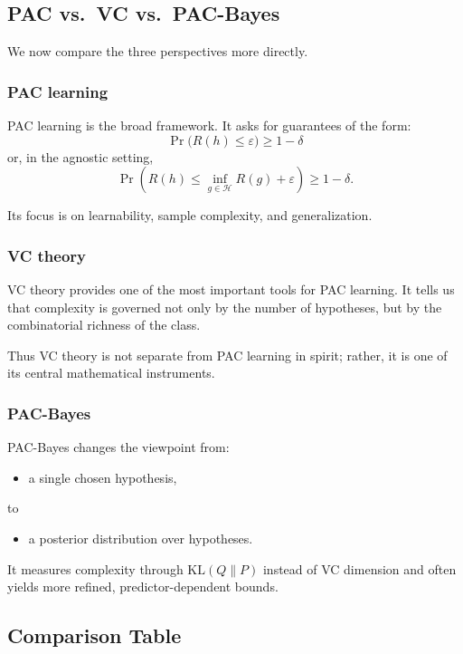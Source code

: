 \subsection{PAC vs.\ VC vs.\ PAC-Bayes}

We now compare the three perspectives more directly.

\subsubsection{PAC learning}

PAC learning is the broad framework. It asks for guarantees of the form:
\[
\Pr\big(R(h)\le \varepsilon\big)\ge 1-\delta
\]
or, in the agnostic setting,
\[
\Pr\left(R(h)\le \inf_{g\in\mathcal{H}}R(g)+\varepsilon\right)\ge 1-\delta.
\]

Its focus is on learnability, sample complexity, and generalization.

\subsubsection{VC theory}

VC theory provides one of the most important tools for PAC learning. It tells us that complexity is governed not only by the number of hypotheses, but by the combinatorial richness of the class.

Thus VC theory is not separate from PAC learning in spirit; rather, it is one of its central mathematical instruments.

\subsubsection{PAC-Bayes}

PAC-Bayes changes the viewpoint from:
\begin{itemize}
    \item a single chosen hypothesis,
\end{itemize}
to
\begin{itemize}
    \item a posterior distribution over hypotheses.
\end{itemize}

It measures complexity through \(\mathrm{KL}(Q\|P)\) instead of VC dimension and often yields more refined, predictor-dependent bounds.

\subsection{Comparison Table}

